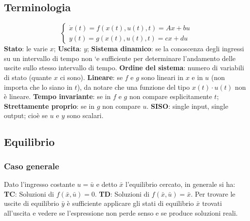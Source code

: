 \fontsize{6pt}{8pt}\selectfont
{}
\begin{landscape}
    \subsection*{Terminologia}
    \[
        \begin{cases}
            \dot{x}(t) = f(x(t),u(t),t) = Ax + bu\\
            y(t) = g(x(t),u(t),t) = cx +du
        \end{cases}
    \]
    \textbf{Stato}: le varie $x$;\newline
    \textbf{Uscita}: $y$;\newline
    \textbf{Sistema dinamico}: se la conoscenza degli ingressi su un intervallo di tempo
    non `e sufficiente per determinare l’andamento delle uscite sullo stesso intervallo di tempo.\newline
    \textbf{Ordine del sistema}: numero di variabili di stato (quante $x$ ci sono).\newline
    \textbf{Lineare}: se $f$ e $g$ sono lineari in $x$ e in $u$ (non importa che lo siano in $t$), da notare che una funzione del tipo $x(t) \cdot u(t)$ non è lineare.\newline
    \textbf{Tempo invariante}: se in $f$ e $g$ non compare esplicitamente $t$;\newline
    \textbf{Strettamente proprio}: se in $g$ non compare $u$.\newline
    \textbf{SISO}: single input, single output; cioè se $u$ e $y$ sono scalari.
    \subsection*{Equilibrio}
    \subsubsection*{Caso generale}
    Dato l'ingresso costante $u = \bar{u}$ e detto $\bar{x}$ l'equilibrio cercato, in generale si ha:\newline
    \textbf{TC}: Soluzioni di $f(\bar{x},\bar{u}) = 0$.\newline
    \textbf{TD}: Soluzioni di $f(\bar{x}, \bar{u}) = \bar{x}$.\newline
    Per trovare le uscite di equilibrio $\bar{y}$ è sufficiente applicare gli stati di equilibrio $\bar{x}$ trovati all'uscita e vedere se l'espressione non perde senso e se produce soluzioni reali.

\end{landscape}
